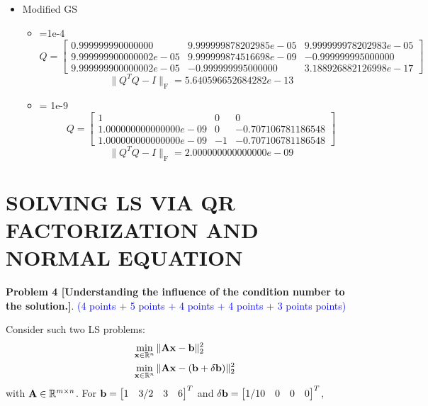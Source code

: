 \documentclass[english,onecolumn]{IEEEtran}
\begin{document}
\begin{enumerate}
\begin{itemize}
   	\item Modified GS
   	\begin{itemize}
   	\item \epsilon=1e-4
   	$$Q=    \begin{bmatrix}
    0.999999990000000 & 9.999999878202985e-05 & 9.999999978202983e-05\\
    9.999999900000002e-05 & 9.999999874516698e-09 & -0.999999995000000\\
    9.999999900000002e-05 & -0.999999995000000 & 3.188926882126998e-17
    \end{bmatrix}$$
    $$\|Q^T  Q - I\|_{\text{F}}=5.640596652684282e-13$$
    \item \epsilon = 1e-9
    $$Q = \begin{bmatrix}
    	1 & 0 & 0\\
    	1.000000000000000e-09 & 0 & -0.707106781186548\\
    	1.000000000000000e-09& -1 & -0.707106781186548
    \end{bmatrix}$$
    $$\|Q^T  Q - I\|_{\text{F}}=2.000000000000000e-09$$
   	\end{itemize}
   \end{itemize}
\end{enumerate}




\newpage
\section{SOLVING LS VIA QR FACTORIZATION AND NORMAL EQUATION}
\noindent\textbf{Problem 4 [Understanding the influence of the condition number to the solution.]}. \textcolor{blue}{(4 points + 5 points + 4 points + 4 points + 3 points points) }

Consider such two LS problems:
\begin{align}
    &\min_{{\bf x}\in\mathbb{R}^n} \|{\bf Ax - b}\|_2^2 \label{axb}\\
    &\min_{{\bf x}\in\mathbb{R}^n} \|{\bf A}{\bf x} - ({\bf b}+\delta{\bf b })\|_2^2 \nonumber%
\end{align}
with ${\bf A}\in \mathbb{R}^{m\times n}$. For ${\bf b} = \begin{bmatrix}
    1 & 3/2 & 3 & 6
    \end{bmatrix}^T$
    and 
    $\delta{\bf b} = \begin{bmatrix}
    1/10 & 0 & 0 & 0
    \end{bmatrix}^T$,
\end{document}

